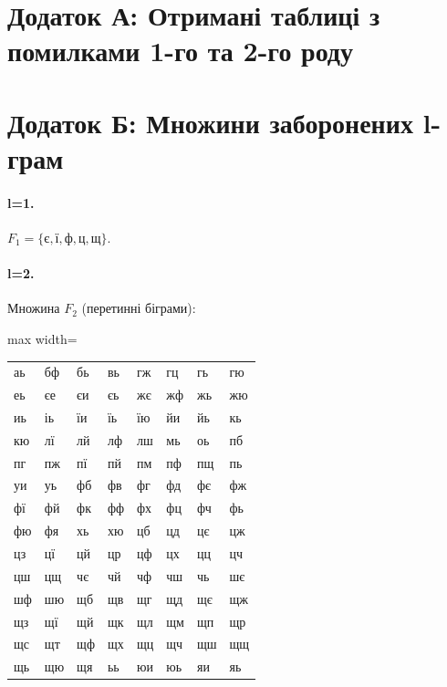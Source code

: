 \documentclass{article}
\begin{document}
\section*{Додаток А: Отримані таблиці з помилками 1-го та 2-го роду}



\section*{Додаток Б: Множини заборонених l-грам}

\paragraph{l=1.} \(F_{1}=\{\text{є}, \text{ї}, \text{ф}, \text{ц}, \text{щ}\}\).

\paragraph{l=2.} Множина \(F_{2}\) (перетинні біграми):
\begin{center}
\begin{adjustbox}{max width=\textwidth}
\begin{tabular}{llllllll}
аь & бф & бь & вь & гж & гц & гь & гю \\
еь & єе & єи & єь & жє & жф & жь & жю \\
иь & іь & їи & їь & їю & йи & йь & кь \\
кю & лї & лй & лф & лш & мь & оь & пб \\
пг & пж & пї & пй & пм & пф & пщ & пь \\
уи & уь & фб & фв & фг & фд & фє & фж \\
фї & фй & фк & фф & фх & фц & фч & фь \\
фю & фя & хь & хю & цб & цд & цє & цж \\
цз & цї & цй & цр & цф & цх & цц & цч \\
цш & цщ & чє & чй & чф & чш & чь & шє \\
шф & шю & щб & щв & щг & щд & щє & щж \\
щз & щї & щй & щк & щл & щм & щп & щр \\
щс & щт & щф & щх & щц & щч & щш & щщ \\
щь & щю & щя & ьь & юи & юь & яи & яь \\
\end{tabular}
\end{adjustbox}
\end{center}
\end{document}
